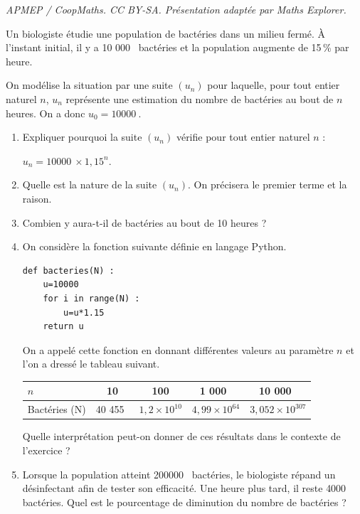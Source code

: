\documentclass[10pt]{article}
\providecommand{\np}[2][]{{#2~#1}}
\begin{document}
\noindent\textit{APMEP / CoopMaths. CC BY-SA. Présentation adaptée par Maths Explorer.}\par\medskip
\medskip

Un biologiste étudie une population de bactéries dans un milieu fermé. À l'instant initial, il y a \np{10 000} bactéries et la population augmente de 15\,\% par heure.

On modélise la situation par une suite $(u_n)$ pour laquelle, pour tout entier naturel $n$, $u_n$ représente une estimation du nombre de bactéries au bout de $n$ heures.
On a donc $u_0= \np{10000}$.
\begin{enumerate}
\item  Expliquer pourquoi la suite $\left(u_n\right)$ vérifie pour tout entier naturel $n$ :

$u_n=\np{10 000} \times 1,15^n$.
\item Quelle est la nature de la suite $\left(u_n\right)$. On précisera le premier terme et la raison.
\item Combien y aura-t-il de bactéries au bout de 10 heures ?
\item On considère la fonction suivante définie en langage Python.

\begin{lstlisting}[style=python]
def bacteries(N) :
	u=10000
	for i in range(N) :
		u=u*1.15
	return u
\end{lstlisting}

On a appelé cette fonction en donnant différentes valeurs au paramètre $n$ et l'on a dressé le tableau suivant.

\begin{center}
\begin{tabular}[]{|m{7em}|*{4}{c|}}\hline
$n$ &10&  100& \np{1 000}& \np{10 000}\\\hline
Bactéries (N)& \np{40 455} &$1,2 \times 10^{10}$ &  $4,99 \times 10^{64}$ & $3,052 \times 10^{307}$\\
\hline
\end{tabular}
\end{center}

Quelle interprétation peut-on donner de ces résultats dans le contexte de l'exercice ?
\item Lorsque la population atteint \np{200000} bactéries, le biologiste répand un désinfectant afin de tester son efficacité. Une heure plus tard, il reste \np{4000}  bactéries. Quel est le pourcentage de diminution du nombre de bactéries ?
\end{enumerate}

\vspace{0,5cm}
\end{document}
